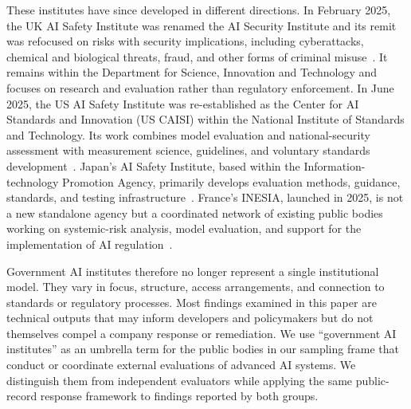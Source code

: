 \documentclass{article}
\begin{document}
These institutes have since developed in different directions. In February 2025, the UK AI Safety Institute was renamed the AI Security Institute and its remit was refocused on risks with security implications, including cyberattacks, chemical and biological threats, fraud, and other forms of criminal misuse~\citep{ukaisi2025}. It remains within the Department for Science, Innovation and Technology and focuses on research and evaluation rather than regulatory enforcement. In June 2025, the US AI Safety Institute was re-established as the Center for AI Standards and Innovation (US CAISI) within the National Institute of Standards and Technology. Its work combines model evaluation and national-security assessment with measurement science, guidelines, and voluntary standards development~\citep{uscaisi2026}. Japan's AI Safety Institute, based within the Information-technology Promotion Agency, primarily develops evaluation methods, guidance, standards, and testing infrastructure~\citep{japanaisi2026}. France's INESIA, launched in 2025, is not a new standalone agency but a coordinated network of existing public bodies working on systemic-risk analysis, model evaluation, and support for the implementation of AI regulation~\citep{inesia2025}.

Government AI institutes therefore no longer represent a single institutional model. They vary in focus, structure, access arrangements, and connection to standards or regulatory processes. Most findings examined in this paper are technical outputs that may inform developers and policymakers but do not themselves compel a company response or remediation. We use ``government AI institutes'' as an umbrella term for the public bodies in our sampling frame that conduct or coordinate external evaluations of advanced AI systems. We distinguish them from independent evaluators while applying the same public-record response framework to findings reported by both groups.
\end{document}
